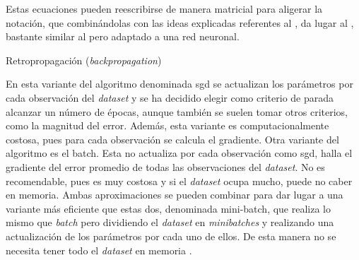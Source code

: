 		Estas ecuaciones pueden reescribirse de manera matricial para aligerar la notación, que combinándolas con las ideas explicadas referentes al , da lugar al , bastante similar al  pero adaptado a una red neuronal. \\
		
		\begin{algorithm}
			\DontPrintSemicolon
			
			\caption{Retropropagación (\textit{backpropagation})}
			\label{algo:backprop}
			
			
		\end{algorithm}
		
		En esta variante del algoritmo denominada \gls{sgd} se actualizan los parámetros por cada observación del \textit{dataset} y se ha decidido elegir como criterio de parada alcanzar un número de épocas, aunque también se suelen tomar otros criterios, como la magnitud del error. Además, esta variante es computacionalmente costosa, pues para cada observación se calcula el gradiente. Otra variante del algoritmo es el batch. Esta no actualiza por cada observación como \gls{sgd}, halla el gradiente del error promedio de todas las observaciones del \textit{dataset}. No es recomendable, pues es muy costosa y si el \textit{dataset} ocupa mucho, puede no caber en memoria. Ambas aproximaciones se pueden combinar para dar lugar a una variante más eficiente que estas dos, denominada mini-batch, que realiza lo mismo que \textit{batch} pero dividiendo el \textit{dataset} en \textit{minibatches} y realizando una actualización de los parámetros por cada uno de ellos. De esta manera no se necesita tener todo el \textit{dataset} en memoria \cite{descenso}. 
		
